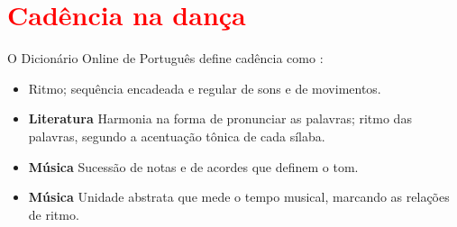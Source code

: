\section{\textcolor{red}{Cadência na dança }}

\begin{definition}[Cadência:] 
\label{def:cadencia}
O Dicionário Online de Português define cadência como \cite{diciocadencia}:
\begin{itemize}
\item Ritmo; sequência encadeada e regular de sons e de movimentos.
\item \textbf{Literatura} Harmonia na forma de pronunciar as palavras; ritmo das palavras, segundo a acentuação tônica de cada sílaba.
\item \textbf{Música} Sucessão de notas e de acordes que definem o tom.
\item \textbf{Música} Unidade abstrata que mede o tempo musical, marcando as relações de ritmo.
\end{itemize}
\end{definition}




